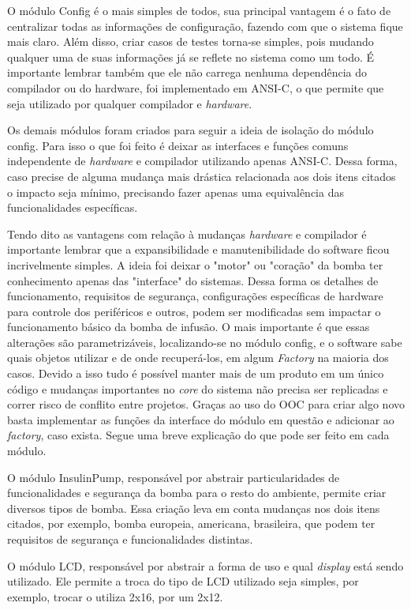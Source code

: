 O módulo Config é o mais simples de todos, sua principal vantagem é o fato de centralizar todas as informações de configuração, fazendo com que o sistema fique mais claro. Além disso, criar casos de testes torna-se simples, pois mudando qualquer uma de suas informações já se reflete no sistema como um todo. É importante lembrar também que ele não carrega nenhuma dependência do compilador ou do hardware, foi implementado em ANSI-C, o que permite que seja utilizado por qualquer compilador e \emph{hardware}.

Os demais módulos foram criados para seguir a ideia de isolação do módulo config. Para isso o que foi feito é deixar as interfaces e funções comuns independente de \emph{hardware} e compilador utilizando apenas ANSI-C. Dessa forma, caso precise de alguma mudança mais drástica relacionada aos dois itens citados o impacto seja mínimo, precisando fazer apenas uma equivalência das funcionalidades específicas. 

Tendo dito as vantagens com relação à mudanças \emph{hardware} e compilador é importante lembrar que a expansibilidade e manutenibilidade do software ficou incrivelmente simples. A ideia foi deixar o "motor" ou "coração" da bomba ter conhecimento apenas das "interface" do sistemas. Dessa forma os detalhes de funcionamento, requisitos de segurança, configurações específicas de hardware para controle dos periféricos e outros, podem ser modificadas sem impactar o funcionamento básico da bomba de infusão. O mais importante é que essas alterações são parametrizáveis, localizando-se no módulo config, e o software sabe quais objetos utilizar e de onde recuperá-los, em algum \emph{Factory} na maioria dos casos. Devido a isso tudo é possível manter mais de um produto em um único código e mudanças importantes no \emph{core} do sistema não precisa ser replicadas e correr risco de conflito entre projetos. Graças ao uso do OOC para criar algo novo basta implementar as funções da interface do módulo em questão e adicionar ao \emph{factory}, caso exista. Segue uma breve explicação do que pode ser feito em cada módulo.

O módulo InsulinPump, responsável por abstrair particularidades de funcionalidades e segurança da bomba para o resto do ambiente, permite criar diversos tipos de bomba. Essa criação leva em conta mudanças nos dois itens citados, por exemplo, bomba europeia, americana, brasileira, que podem ter requisitos de segurança e funcionalidades distintas.

O módulo LCD, responsável por abstrair a forma de uso e qual \emph{display} está sendo utilizado. Ele permite a troca do tipo de LCD utilizado seja simples, por exemplo, trocar o utiliza 2x16, por um 2x12.

